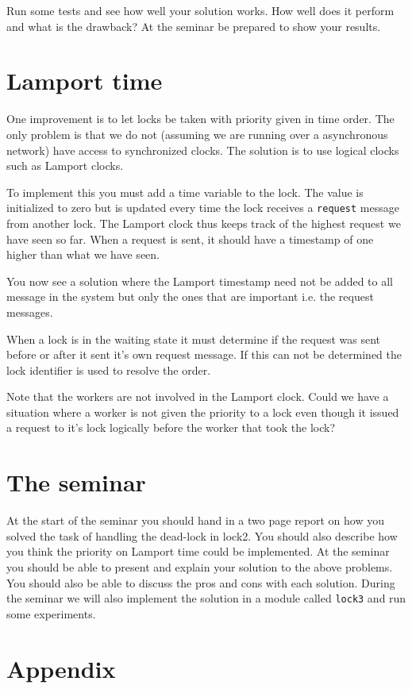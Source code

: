 \documentclass[a4paper, 11pt]{article}
\newcommand{\nnsection}[1]{
\section*{#1}
\addcontentsline{toc}{section}{#1}
}
\begin{document}
Run some tests and see how well your solution works. How well does it
perform and what is the drawback? At the seminar be prepared to show
your results.

\section{Lamport time}

One improvement is to let locks be taken with priority given in time
order. The only problem is that we do not (assuming we are running
over a asynchronous network) have access to synchronized clocks. The
solution is to use logical clocks such as Lamport clocks.

To implement this you must add a time variable to the lock. The value
is initialized to zero but is updated every time the lock receives a
{\tt request} message from another lock. The Lamport clock thus keeps
track of the highest request we have seen so far. When a request is
sent, it should have a timestamp of one higher than what we have seen. 

You now see a solution where the Lamport timestamp need not be added
to all message in the system but only the ones that are important
i.e. the request messages.

When a lock is in the waiting state it must determine if the request
was sent before or after it sent it's own request message. If this can
not be determined the lock identifier is used to resolve the order.

Note that the workers are not involved in the Lamport clock. Could we
have a situation where a worker is not given the priority to a lock
even though it issued a request to it's lock logically before the
worker that took the lock?

\section{The seminar}

At the start of the seminar you should hand in a two page report on
how you solved the task of handling the dead-lock in lock2. You should
also describe how you think the priority on Lamport time could be
implemented. At the seminar you should be able to present and explain
your solution to the above problems. You should also be able to
discuss the pros and cons with each solution. During the seminar we
will also implement the solution in a module called {\tt lock3} and
run some experiments.


\nnsection{Appendix}
\end{document}
